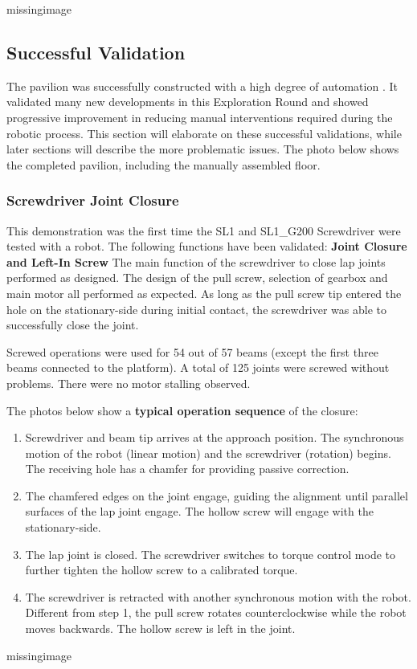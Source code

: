 missingimage

\subsection{Successful Validation}
\label{subsection:exploration-4-successful-validation}

The pavilion was successfully constructed with a high degree of automation . It validated many new developments in this Exploration Round and showed progressive improvement in reducing manual interventions required during the robotic process. This section will elaborate on these successful validations, while later sections will describe the more problematic issues.
The photo below shows the completed pavilion, including the manually assembled floor.

\subsubsection{Screwdriver Joint Closure}
\label{subsubsection:exploration-4-screwdriver-joint-closure}

This demonstration was the first time the SL1 and SL1\_G200 Screwdriver were tested with a robot. The following functions have been validated:
\textbf{Joint Closure and Left-In Screw}
The main function of the screwdriver to close lap joints performed as designed. The design of the pull screw, selection of gearbox and main motor all performed as expected. As long as the pull screw tip entered the hole on the stationary-side during initial contact, the screwdriver was able to successfully close the joint. 

Screwed operations were used for 54 out of 57 beams (except the first three beams connected to the platform). A total of 125 joints were screwed without problems. There were no motor stalling observed.

The photos below show a \textbf{typical operation sequence }of the closure:
\begin{enumerate}
    \item Screwdriver and beam tip arrives at the approach position. The synchronous motion of the robot (linear motion) and the screwdriver (rotation) begins. The receiving hole has a chamfer for providing passive correction.
    \item The chamfered edges on the joint engage, guiding the alignment until parallel surfaces of the lap joint engage. The hollow screw will engage with the stationary-side.
    \item The lap joint is closed. The screwdriver switches to torque control mode to further tighten the hollow screw to a calibrated torque.
    \item The screwdriver is retracted with another synchronous motion with the robot. Different from step 1, the pull screw rotates counterclockwise while the robot moves backwards. The hollow screw is left in the joint.
\end{enumerate}
missingimage

